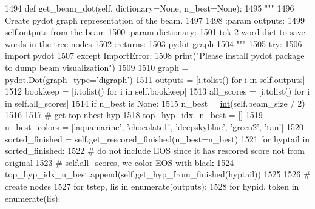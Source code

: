 \begin{DoxyCode}
1494     \textcolor{keyword}{def }get\_beam\_dot(self, dictionary=None, n\_best=None):
1495         \textcolor{stringliteral}{"""}
1496 \textcolor{stringliteral}{        Create pydot graph representation of the beam.}
1497 \textcolor{stringliteral}{}
1498 \textcolor{stringliteral}{        :param outputs:}
1499 \textcolor{stringliteral}{            self.outputs from the beam}
1500 \textcolor{stringliteral}{        :param dictionary:}
1501 \textcolor{stringliteral}{            tok 2 word dict to save words in the tree nodes}
1502 \textcolor{stringliteral}{        :returns:}
1503 \textcolor{stringliteral}{            pydot graph}
1504 \textcolor{stringliteral}{        """}
1505         \textcolor{keywordflow}{try}:
1506             \textcolor{keyword}{import} pydot
1507         \textcolor{keywordflow}{except} ImportError:
1508             print(\textcolor{stringliteral}{"Please install pydot package to dump beam visualization"})
1509 
1510         graph = pydot.Dot(graph\_type=\textcolor{stringliteral}{'digraph'})
1511         outputs = [i.tolist() \textcolor{keywordflow}{for} i \textcolor{keywordflow}{in} self.outputs]
1512         bookkeep = [i.tolist() \textcolor{keywordflow}{for} i \textcolor{keywordflow}{in} self.bookkeep]
1513         all\_scores = [i.tolist() \textcolor{keywordflow}{for} i \textcolor{keywordflow}{in} self.all\_scores]
1514         \textcolor{keywordflow}{if} n\_best \textcolor{keywordflow}{is} \textcolor{keywordtype}{None}:
1515             n\_best = \hyperlink{namespacelanguage__model_1_1eval__ppl_a7d12ee00479673c5c8d1f6d01faa272a}{int}(self.beam\_size / 2)
1516 
1517         \textcolor{comment}{# get top nbest hyp}
1518         top\_hyp\_idx\_n\_best = []
1519         n\_best\_colors = [\textcolor{stringliteral}{'aquamarine'}, \textcolor{stringliteral}{'chocolate1'}, \textcolor{stringliteral}{'deepskyblue'}, \textcolor{stringliteral}{'green2'}, \textcolor{stringliteral}{'tan'}]
1520         sorted\_finished = self.get\_rescored\_finished(n\_best=n\_best)
1521         \textcolor{keywordflow}{for} hyptail \textcolor{keywordflow}{in} sorted\_finished:
1522             \textcolor{comment}{# do not include EOS since it has rescored score not from original}
1523             \textcolor{comment}{# self.all\_scores, we color EOS with black}
1524             top\_hyp\_idx\_n\_best.append(self.get\_hyp\_from\_finished(hyptail))
1525 
1526         \textcolor{comment}{# create nodes}
1527         \textcolor{keywordflow}{for} tstep, lis \textcolor{keywordflow}{in} enumerate(outputs):
1528             \textcolor{keywordflow}{for} hypid, token \textcolor{keywordflow}{in} enumerate(lis):

\end{DoxyCode}
